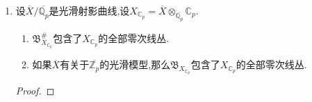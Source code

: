 \begin{enumerate}
\begin{proof}
        归结为的事情告诉我们$\rho^*\otimes\mathfrak{o}_n$是零映射.倘若我们可以证明左侧垂直映射是满射,就得到$\rho_n^*$是零映射完成断言的证明.下面证明这个满射:按照$\overline{\mathbb{Z}_p}$在$R$上平坦(PID上平坦等价于无挠),就有$\mathfrak{o}_n=\overline{\mathbb{Z}_p}/p^n\overline{\mathbb{Z}_p}$在$R/p^nR$上平坦,于是归结为证明$\mathrm{H}^1(\mathcal{Y}_R,\mathscr{O})\otimes_RR/p^nR\to\mathrm{H}^1(\mathcal{Y}_R\otimes_RR/p^R,\mathscr{O})$是满射【需要平坦性吗?】.又因为这里$R$是局部环,所以这个满射归结为基变换到剩余域$\kappa$上是满射.考虑如下交换图表,按照引理1,这里两个非水平的映射都是同构,迫使水平映射是满射.
        $$\xymatrix{\mathrm{H}^1(\mathcal{Y}_R,\mathscr{O})\otimes_R\kappa\ar[rr]\ar[dr]&&\mathrm{H}^1(\mathcal{Y}_R\otimes_RR/p^nR,\mathscr{O})\otimes_{R/p^nR}\kappa\\&\mathrm{H}^1(\mathcal{Y}_{\kappa},\mathscr{O})&}$$
        
        最后只剩下证明可以找到(它们都是$\overline{\mathbb{Z}_p}$和$\overline{\mathbb{Q}_p}$上的)$\mathscr{S}_{\mathcal{X},D}$中的态射$\rho:\mathcal{Z}\to\mathcal{Y}$,使得诱导的$\rho^*:\mathrm{H}^1(\mathcal{Y},\mathscr{O})\to\mathrm{H}^1(\mathcal{Z},\mathscr{O})$满足像集落在$p^n\mathrm{H}^1(\mathcal{Z},\mathscr{O})$中.按照前面的定理(这里用到了亏格非零),我们可以把$R$替换为适当的有限扩张(仍然是DVR),使得可以找到$\mathcal{S}^{\mathrm{ss}}_{\mathcal{Y}_{R}}$中的态射$\rho:\mathcal{Z}\to\mathcal{Y}$,使得存在$g(0)=0$的$g$满足如下交换图表:
        $$\xymatrix{\mathrm{Pic}^0(\mathcal{Y}/R)\ar[rr]^{\rho^*}\ar[dr]_{p^n}&&\mathrm{Pic}^0(\mathcal{Z}/R)\\&\mathrm{Pic}^0(\mathcal{Y}/R)\ar[ur]_g&}$$
        
        取群概形的李代数,得到如下交换图表:
        $$\xymatrix{\mathrm{H}^1(\mathcal{Y},\mathscr{O})\ar[rr]^{\rho^*}\ar[dr]_{p^n}&&\mathrm{H}^1(\mathcal{Z},\mathscr{O})\\&\mathrm{H}^1(\mathcal{Y},\mathscr{O})\ar[ur]_{g^*}&}$$
        
        于是得到$\rho^*(\mathrm{H}^1(\mathcal{Y},\mathscr{O}))\subseteq p^n\mathrm{H}^1(\mathcal{Z},\mathscr{O})$.最后把它们基变换到$\overline{\mathbb{Z}_p}$和$\overline{\mathbb{Q}_p}$上即可.
    \end{proof}
    \item 设$\overline{X}/\overline{\mathbb{Q}_p}$是光滑射影曲线,设$X_{\mathbb{C}_p}=\overline{X}\otimes_{\overline{\mathbb{Q}_p}}\mathbb{C}_p$.
    \begin{enumerate}[(1)]
    	\item $\mathfrak{B}_{X_{\mathbb{C}_p}}^{\#}$包含了$X_{\mathbb{C}_p}$的全部零次线丛.
    	\item 如果$\overline{X}$有关于$\overline{\mathbb{Z}_p}$的光滑模型,那么$\mathfrak{B}_{X_{\mathbb{C}_p}}$包含了$X_{\mathbb{C}_p}$的全部零次线丛.
    \end{enumerate}
    \begin{proof}
    	

\end{proof}
\end{enumerate}
